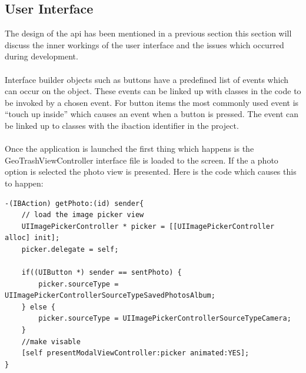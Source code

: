 \documentclass[12pt]{article}
\begin{document}
\subsection{User Interface}

The design of the \gls{api} has been mentioned in a previous section this section will discuss the inner workings of the user interface and the issues which occurred during development.
\paragraph{}

Interface builder objects such as buttons have a predefined list of events which can occur on the object. These events can be linked up with classes in the code to be invoked by a chosen event. For button items the most commonly used event is “touch up inside” which causes an event when a button is pressed. The event can be linked up to classes with the \gls{ibaction} identifier in the project. 

\paragraph{}

Once the application is launched the first thing which happens is the GeoTrashViewController interface file is loaded to the screen. If the a photo option is selected the photo view is presented. Here is the code which causes this to happen:
\begin{verbatim}
-(IBAction) getPhoto:(id) sender{
	// load the image picker view
	UIImagePickerController * picker = [[UIImagePickerController alloc] init];
	picker.delegate = self;
	
	if((UIButton *) sender == sentPhoto) {
		picker.sourceType = UIImagePickerControllerSourceTypeSavedPhotosAlbum;
	} else {
		picker.sourceType = UIImagePickerControllerSourceTypeCamera;
	}
	//make visable
	[self presentModalViewController:picker animated:YES];
}
\end{verbatim}
\end{document}
